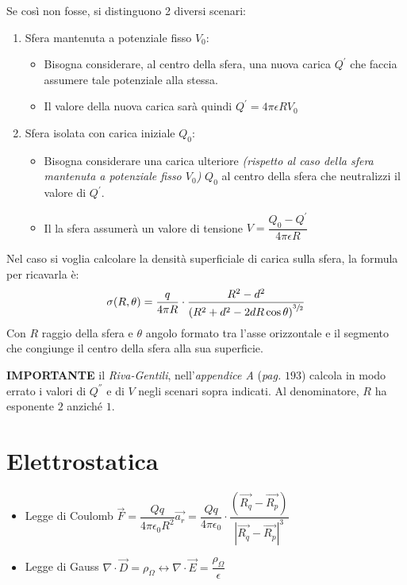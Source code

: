 \documentclass{article}
\begin{document}
Se così non fosse, si distinguono 2 diversi scenari:
\begin{enumerate}
	\item Sfera mantenuta a potenziale fisso \(V_0\):
	      \begin{itemize}
		      \item Bisogna considerare, al centro della sfera, una nuova carica \(Q^{'}\) che faccia assumere tale potenziale alla stessa.
		      \item Il valore della nuova carica sarà quindi \(Q^{'} = 4 \pi \epsilon R V_0\)
	      \end{itemize}

	\item Sfera isolata con carica iniziale \(Q_0\):
	      \begin{itemize}
		      \item Bisogna considerare una carica ulteriore \textit{(rispetto al caso della sfera mantenuta a potenziale fisso \(V_0\))} \(Q_0\) al centro della sfera che neutralizzi il valore di \(Q^{'}\).
		      \item Il la sfera assumerà un valore di tensione \(V = \dfrac{Q_0 - Q^{'}}{4 \pi \epsilon R} \)
	      \end{itemize}
\end{enumerate}

Nel caso si voglia calcolare la densità superficiale di carica sulla sfera, la formula per ricavarla è:
\[
	\sigma(R, \theta) = \dfrac{q}{4 \pi R} \cdot \dfrac{R^2 - d^2}{\left(R^2 + d^2 - 2dR\cos\theta\right) ^ {\sfrac{3}{2}}}
\]
Con \(R\) raggio della sfera e \(\theta\) angolo formato tra l'asse orizzontale e il segmento che congiunge il centro della sfera alla sua superficie.

\bigskip

\textbf{IMPORTANTE} il \textit{Riva-Gentili}, nell'\textit{appendice A} (\textit{pag.} \(193\)) calcola in modo errato i valori di \(Q^{''}\) e di \(V\) negli scenari sopra indicati. Al denominatore, \(R\) ha esponente \(2\) anziché \(1\).


\newpage

\section{Elettrostatica}
\begin{itemize}
	\item Legge di Coulomb \( \vec{F} = \dfrac{Qq}{4 \pi \epsilon_0 R^2} \vec{a_r} = \dfrac{Qq}{4 \pi \epsilon_0} \cdot \dfrac{(\vec{R_q} - \vec{R_p})}{| \vec{R_q} - \vec{R_p} | ^3 } \)
	\item Legge di Gauss \( \nabla \cdot \vec{D} = \rho_\Omega \leftrightarrow \nabla \cdot \vec{E} = \dfrac{\rho_\Omega}{\epsilon} \)
\end{itemize}
\end{document}
